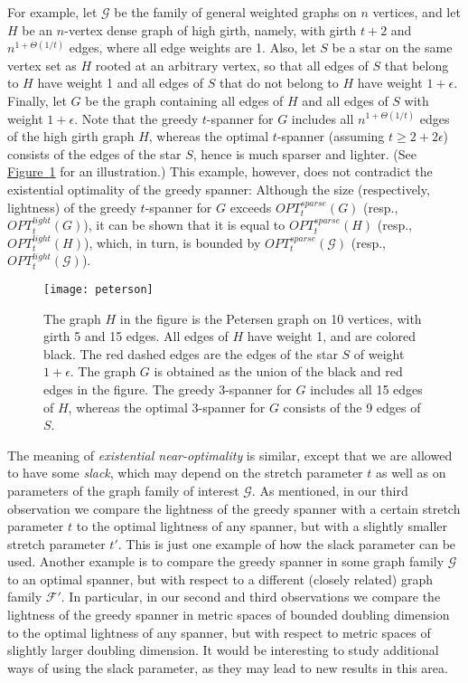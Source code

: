 \documentclass[11pt,letterpaper]{article}
\newcommand{\eps}{\epsilon}
\newcommand{\namedref}[2]{\hyperref[#2]{#1~\ref*{#2}}}
\newcommand{\figureref}[1]{\namedref{Figure}{#1}}
\begin{document}
{For example, let $\mathcal{G}$ be the family of general weighted graphs on $n$ vertices, and let $H$ be an $n$-vertex dense graph of high girth,
	namely, with girth $t+2$ and $n^{1+\Theta(1/t)}$ edges, where all edge weights are 1.
	Also, let $S$ be a star on the same vertex set as $H$ rooted at an arbitrary vertex,
	so that all edges of $S$ that belong to $H$ have weight 1 and all edges of $S$ that do not belong to $H$ have weight $1+\eps$.
	Finally, let $G$ be the graph containing all edges of $H$ and all edges of $S$ with weight $1+\eps$.
	Note that the greedy $t$-spanner for $G$ includes all $n^{1+\Theta(1/t)}$ edges of the high girth graph $H$,
	whereas the optimal $t$-spanner (assuming $t \ge 2+2\eps$) consists of the edges of the star $S$, hence is much sparser and lighter.
	(See \figureref{fig:girth} for an illustration.)
	This example, however, does not contradict the existential optimality of the greedy spanner: Although
	the size (respectively, lightness) of the greedy $t$-spanner for $G$ exceeds $OPT^{sparse}_t(G)$ (resp., $OPT^{light}_t(G)$), it can be shown that it is equal to
	$OPT^{sparse}_t(H)$ (resp., $OPT^{light}_t(H)$), which, in turn, is bounded by $OPT^{sparse}_t(\mathcal{G})$  (resp., $OPT^{light}_t(\mathcal{G})$).}
\begin{figure}
	\begin{center}
		\texttt{[image: peterson]}
		\caption{\small  The graph $H$ in the figure is the Petersen graph on 10 vertices, with girth 5 and 15 edges.
			All edges of $H$ have weight 1, and are colored black.
			The red dashed edges are the edges of the star $S$ of weight $1+\eps$.
			The graph $G$ is obtained as the union of the black and red edges in the figure.
			The greedy 3-spanner for $G$ includes all 15 edges of $H$, whereas the optimal 3-spanner for $G$ consists of the 9 edges of $S$.}				
		\label{fig:girth}
	\end{center}
\end{figure}


The meaning of \emph{existential near-optimality} is similar, except that we are allowed to have some \emph{slack},
which may depend on the stretch parameter $t$ as well as on parameters of the graph family of interest $\mathcal{G}$.
As mentioned, in our third observation we compare the lightness of the greedy spanner with a certain stretch parameter $t$
to the optimal lightness of any spanner, but with a slightly smaller stretch parameter $t'$.
This is just one example of how the slack parameter can be used.
Another example is to compare the greedy spanner in some graph family $\mathcal{G}$ to an optimal spanner, but with respect to a different (closely related) graph family $\mathcal{F'}$.
In particular, in our second and third observations we compare the lightness of the greedy spanner in metric spaces of bounded doubling dimension
to the optimal lightness of any spanner, but with respect to metric spaces of slightly larger doubling dimension.
It would be interesting to study additional ways of using the slack parameter,
as they may lead to new results in this area.
\end{document}
